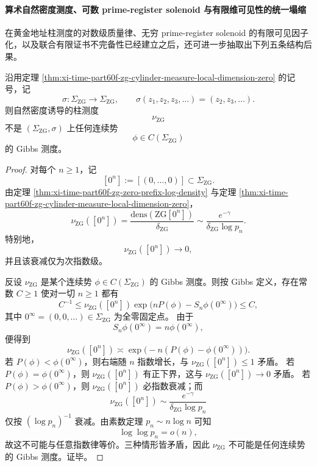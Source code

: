 \paragraph{算术自然密度测度、可数 prime-register solenoid 与有限维可见性的统一塌缩}
在黄金地址柱测度的对数级质量律、无穷 prime-register solenoid 的有限可见因子化，以及联合有限证书不完备性已经建立之后，还可进一步抽取出下列五条结构后果。

\begin{theorem}\label{thm:xi-time-part60f2-zg-density-measure-non-gibbs}
沿用定理 \ref{thm:xi-time-part60f-zg-cylinder-measure-local-dimension-zero} 的记号，记
\[
\sigma:\Sigma_{\mathrm{ZG}}\to \Sigma_{\mathrm{ZG}},
\qquad
\sigma(z_1,z_2,z_3,\dots)=(z_2,z_3,\dots).
\]
则自然密度诱导的柱测度
\[
\nu_{\mathrm{ZG}}
\]
不是 \((\Sigma_{\mathrm{ZG}},\sigma)\) 上任何连续势
\[
\phi\in C(\Sigma_{\mathrm{ZG}})
\]
的 Gibbs 测度。
\end{theorem}
\begin{proof}
对每个 \(n\ge 1\)，记
\[
[0^n]:=[(0,\dots,0)]\subset \Sigma_{\mathrm{ZG}}.
\]
由定理 \ref{thm:xi-time-part60f-zg-zero-prefix-log-density} 与定理 \ref{thm:xi-time-part60f-zg-cylinder-measure-local-dimension-zero}，
\[
\nu_{\mathrm{ZG}}([0^n])
=
\frac{\mathrm{dens}(\mathrm{ZG}[0^n])}{\delta_{\mathrm{ZG}}}
\sim
\frac{e^{-\gamma}}{\delta_{\mathrm{ZG}}\log p_n}.
\]
特别地，
\[
\nu_{\mathrm{ZG}}([0^n])\to 0,
\]
并且该衰减仅为次指数级。

反设 \(\nu_{\mathrm{ZG}}\) 是某个连续势 \(\phi\in C(\Sigma_{\mathrm{ZG}})\) 的 Gibbs 测度。则按 Gibbs 定义，存在常数 \(C\ge 1\) 使对一切 \(n\ge 1\) 都有
\[
C^{-1}
\le
\nu_{\mathrm{ZG}}([0^n])
\exp\!\bigl(nP(\phi)-S_n\phi(0^\infty)\bigr)
\le
C,
\]
其中 \(0^\infty=(0,0,\dots)\in\Sigma_{\mathrm{ZG}}\) 为全零固定点。
由于
\[
S_n\phi(0^\infty)=n\phi(0^\infty),
\]
便得到
\[
\nu_{\mathrm{ZG}}([0^n])\asymp \exp\!\bigl(-n(P(\phi)-\phi(0^\infty))\bigr).
\]
若 \(P(\phi)<\phi(0^\infty)\)，则右端随 \(n\) 指数增长，与 \(\nu_{\mathrm{ZG}}([0^n])\le 1\) 矛盾。
若 \(P(\phi)=\phi(0^\infty)\)，则 \(\nu_{\mathrm{ZG}}([0^n])\) 有正下界，这与 \(\nu_{\mathrm{ZG}}([0^n])\to 0\) 矛盾。
若 \(P(\phi)>\phi(0^\infty)\)，则 \(\nu_{\mathrm{ZG}}([0^n])\) 必指数衰减；而
\[
\nu_{\mathrm{ZG}}([0^n])\sim \frac{e^{-\gamma}}{\delta_{\mathrm{ZG}}\log p_n}
\]
仅按 \((\log p_n)^{-1}\) 衰减。由素数定理 \(p_n\sim n\log n\) 可知
\[
\log\log p_n=o(n),
\]
故这不可能与任意指数律等价。三种情形皆矛盾，因此 \(\nu_{\mathrm{ZG}}\) 不可能是任何连续势的 Gibbs 测度。证毕。
\end{proof}

